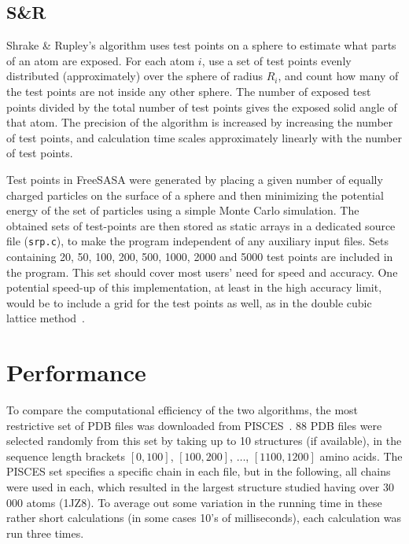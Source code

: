 \documentclass[a4paper,11pt]{article}
\begin{document}
\begin{small}
\subsection{S\&R}

Shrake \& Rupley's algorithm uses test points on a sphere to estimate
what parts of an atom are exposed. For each atom $i$, use a set of
test points evenly distributed (approximately) over the sphere of
radius $R_i$, and count how many of the test points are not inside any
other sphere. The number of exposed test points divided by the total
number of test points gives the exposed solid angle of that atom. The
precision of the algorithm is increased by increasing the number of
test points, and calculation time scales approximately linearly with
the number of test points.

Test points in FreeSASA were generated by placing a given number of
equally charged particles on the surface of a sphere and then
minimizing the potential energy of the set of particles using a simple
Monte Carlo simulation. The obtained sets of test-points are then
stored as static arrays in a dedicated source file (\texttt{srp.c}),
to make the program independent of any auxiliary input files. Sets
containing 20, 50, 100, 200, 500, 1000, 2000 and 5000 test points are
included in the program. This set should cover most users' need for
speed and accuracy. One potential speed-up of this implementation, at
least in the high accuracy limit, would be to include a grid for the
test points as well, as in the double cubic lattice
method~\cite{DCLM}.
 
\section{Performance}\label{sec:performance}

To compare the computational efficiency of the two algorithms, the
most restrictive set of PDB files was downloaded from
PISCES~\cite{PISCES}.  88 PDB files were selected randomly from this
set by taking up to 10 structures (if available), in the sequence
length brackets $[0,100]$, $[100,200]$, $\dots$, $[1100,1200]$ amino
acids. The PISCES set specifies a specific chain in each file, but in
the following, all chains were used in each, which resulted in the
largest structure studied having over 30\,000 atoms (1JZ8). To average
out some variation in the running time in these rather short
calculations (in some cases 10's of milliseconds), each calculation was
run three times.


\end{small}
\end{document}
